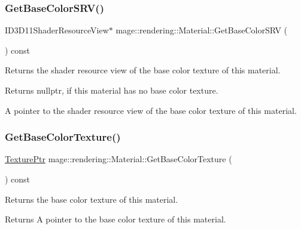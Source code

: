 \subsubsection{\texorpdfstring{Get\+Base\+Color\+S\+R\+V()}{GetBaseColorSRV()}}
{\footnotesize\ttfamily I\+D3\+D11\+Shader\+Resource\+View$\ast$ mage\+::rendering\+::\+Material\+::\+Get\+Base\+Color\+S\+RV (\begin{DoxyParamCaption}{ }\end{DoxyParamCaption}) const\hspace{0.3cm}{\ttfamily [noexcept]}}

Returns the shader resource view of the base color texture of this material.

\begin{DoxyReturn}{Returns}
{\ttfamily nullptr}, if this material has no base color texture. 

A pointer to the shader resource view of the base color texture of this material. 
\end{DoxyReturn}
\hypertarget{classmage_1_1rendering_1_1_material_ac9ce1aff5b5e3d34ae83eb194786cebe}{}\label{classmage_1_1rendering_1_1_material_ac9ce1aff5b5e3d34ae83eb194786cebe} 
\subsubsection{\texorpdfstring{Get\+Base\+Color\+Texture()}{GetBaseColorTexture()}}
{\footnotesize\ttfamily \hyperlink{namespacemage_1_1rendering_a6f3ae54f825328465b0cdde0f0de4a36}{Texture\+Ptr} mage\+::rendering\+::\+Material\+::\+Get\+Base\+Color\+Texture (\begin{DoxyParamCaption}{ }\end{DoxyParamCaption}) const\hspace{0.3cm}{\ttfamily [noexcept]}}

Returns the base color texture of this material.

\begin{DoxyReturn}{Returns}
A pointer to the base color texture of this material. 
\end{DoxyReturn}
\hypertarget{classmage_1_1rendering_1_1_material_a0464566ef674bf074d0af22e852daaa3}{}\label{classmage_1_1rendering_1_1_material_a0464566ef674bf074d0af22e852daaa3} 
